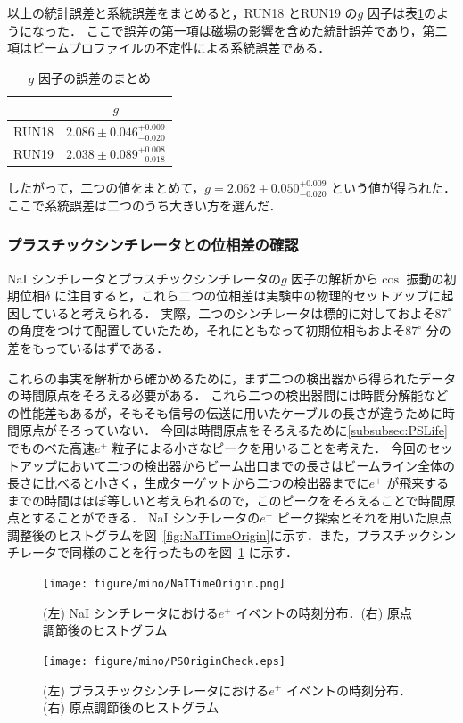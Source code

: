 以上の統計誤差と系統誤差をまとめると，RUN18 とRUN19 の$g$ 因子は表\ref{tab:NaIggosamatome}のようになった．
ここで誤差の第一項は磁場の影響を含めた統計誤差であり，第二項はビームプロファイルの不定性による系統誤差である．

\begin{table}[H]%
\caption{$g$ 因子の誤差のまとめ}
\centering
\begingroup
\renewcommand{\arraystretch}{1.2}%
\begin{tabular}{cc}\toprule
{} &   $g$  \\ \midrule
RUN18 & $2.086 \pm 0.046^{+0.009}_{-0.020} $  \\
RUN19 & $2.038 \pm 0.089^{+0.008}_{-0.018} $  \\ \bottomrule
\end{tabular}\label{tab:NaIggosamatome}
\endgroup
\end{table}

したがって，二つの値をまとめて，$g = 2.062 \pm 0.050^{+0.009}_{-0.020}$ という値が得られた．ここで系統誤差は二つのうち大きい方を選んだ．

\subsubsection{プラスチックシンチレータとの位相差の確認}
\label{subsubsec:PhaseCheck}

NaI シンチレータとプラスチックシンチレータの$g$ 因子の解析から$\cos$ 振動の初期位相$\delta$ に注目すると，これら二つの位相差は実験中の物理的セットアップに起因していると考えられる．
実際，二つのシンチレータは標的に対しておよそ$87^{\circ}$ の角度をつけて配置していたため，それにともなって初期位相もおよそ$87^{\circ}$ 分の差をもっているはずである．

これらの事実を解析から確かめるために，まず二つの検出器から得られたデータの時間原点をそろえる必要がある．
これら二つの検出器間には時間分解能などの性能差もあるが，そもそも信号の伝送に用いたケーブルの長さが違うために時間原点がそろっていない．
今回は時間原点をそろえるために\ref{subsubsec:PSLife} でものべた高速$e^{+}$ 粒子による小さなピークを用いることを考えた．
今回のセットアップにおいて二つの検出器からビーム出口までの長さはビームライン全体の長さに比べると小さく，生成ターゲットから二つの検出器までに$e^{+}$ が飛来するまでの時間はほぼ等しいと考えられるので，このピークをそろえることで時間原点とすることができる．
NaI シンチレータの$e^{+}$ ピーク探索とそれを用いた原点調整後のヒストグラムを図~\ref{fig:NaITimeOrigin}に示す．また，プラスチックシンチレータで同様のことを行ったものを図~\ref{fig:PSTimeOrigin} に示す．
\begin{figure}[h]
	\centering
	\texttt{[image: figure/mino/NaITimeOrigin.png]}
	\caption{(左) NaI シンチレータにおける$e^{+}$ イベントの時刻分布．(右) 原点調節後のヒストグラム}
	\label{fig:NaITimeOrigin}
	\texttt{[image: figure/mino/PSOriginCheck.eps]}
	\caption{(左) プラスチックシンチレータにおける$e^{+}$ イベントの時刻分布．(右) 原点調節後のヒストグラム}
	\label{fig:PSTimeOrigin}
\end{figure}

